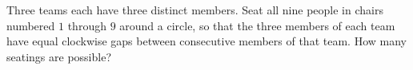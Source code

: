 Three teams each have three distinct members. Seat all nine people in chairs numbered $1$ through $9$ around a circle, so that the three members of each team have equal clockwise gaps between consecutive members of that team. How many seatings are possible?

